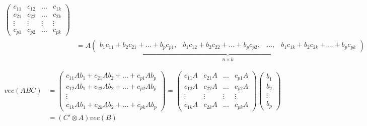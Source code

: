 \documentclass[a4paper]{scrartcl}
\begin{document}
\begin{enumerate}
\begin{solution}
\begin{align*}
\begin{pmatrix}
                          c_{11} & c_{12} & \dots  & c_{1k} \\
                          c_{21} & c_{22} & \dots  & c_{2k} \\
                          \vdots & \vdots & \vdots & \vdots \\
                          c_{p1} & c_{p2} & \dots  & c_{pk}
                      \end{pmatrix}                                                                                                                                                          \\
                          & = A \underbrace{\begin{pmatrix} b_1c_{11}+b_2c_{21}+\dots+b_p c_{p1},& b_1c_{12}+b_2c_{22}+\dots+b_p c_{p2}, & \dots ,& b_1c_{1k}+b_2c_{2k}+\dots+b_p c_{pk}\end{pmatrix}}_{n\times k}
                  \end{align*}
                  
                  \begin{align*}
                      vec(ABC) & = \begin{pmatrix} c_{11}A b_1 +c_{21}A b_2+\dots+ c_{p1}A b_p\\ c_{12}A b_1+c_{22} A b_2 + \dots +  c_{p2} A b_p \\ \vdots \\ c_{1k}A b_1+ c_{2k} A b_2 +\dots+ c_{pk} A b_p  \end{pmatrix}
                      = \begin{pmatrix} c_{11}A &  c_{21}A  & \dots & c_{p1}A \\ c_{12}A  & c_{22} A & \dots & c_{p2} A\\ \vdots & \vdots &\vdots&\vdots \\ c_{1k}A & c_{2k} A &\dots& c_{pk} A  \end{pmatrix} \begin{pmatrix} b_1\\b_2\\ \vdots\\b_p\end{pmatrix} \\
                               & = \left(C'\otimes A\right) vec(B)
                  \end{align*}
                  
              \end{solution}
              

\end{enumerate}
\end{document}

